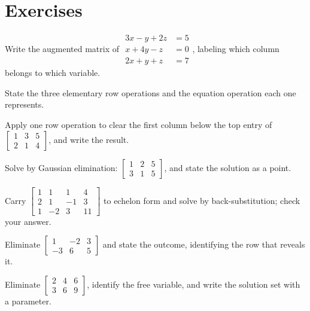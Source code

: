 \documentclass[12pt]{book}
\begin{document}
\section{Exercises}

\begin{exercises}
\item Write the augmented matrix of
$\begin{aligned}3x-y+2z&=5\\ x+4y-z&=0\\ 2x+y+z&=7\end{aligned}$, labeling which
column belongs to which variable.

\item State the three elementary row operations and the equation operation each one
represents.

\item Apply one row operation to clear the first column below the top entry of
$\left[\begin{array}{cc|c}1&3&5\\ 2&1&4\end{array}\right]$, and write the result.

\item Solve by Gaussian elimination:
$\left[\begin{array}{cc|c}1&2&5\\ 3&1&5\end{array}\right]$, and state the solution as
a point.

\item Carry
$\left[\begin{array}{ccc|c}1&1&1&4\\ 2&1&-1&3\\ 1&-2&3&11\end{array}\right]$
to echelon form and solve by back-substitution; check your answer.

\item Eliminate
$\left[\begin{array}{cc|c}1&-2&3\\ -3&6&5\end{array}\right]$
and state the outcome, identifying the row that reveals it.

\item Eliminate
$\left[\begin{array}{cc|c}2&4&6\\ 3&6&9\end{array}\right]$,
identify the free variable, and write the solution set with a parameter.


\end{exercises}
\end{document}
